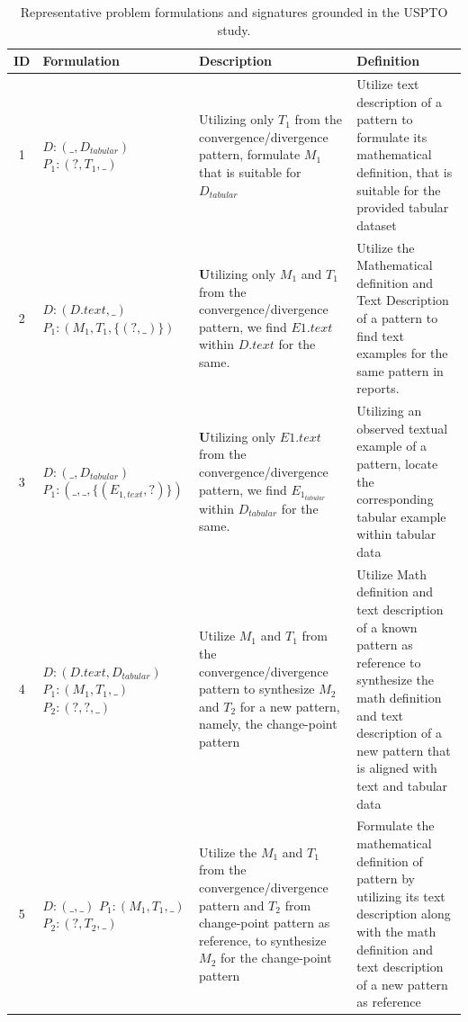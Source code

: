 \documentclass[sigconf,nonacm,anonymous]{acmart}
\begin{document}
\begin{table}[t]
\centering
\small
\setlength{\tabcolsep}{4pt}
\renewcommand{\arraystretch}{1.7} %
\caption{Representative problem formulations and signatures grounded in the USPTO study.}
\label{tab:problem-catalog}
\begin{tabular}{c|p{}|p{}|p{}}
\hline
\textbf{ID} & \textbf{Formulation} & \textbf{Description} & \textbf{Definition} \\
\hline

1 & 
$D: (\_, D_{tabular})$ \newline
$P_1 : (?, T_1, \_)$
& Utilizing only $T_1$ from the convergence/divergence pattern, formulate $M_1$ that is suitable for $D_{tabular}$
& Utilize text description of a pattern to formulate its mathematical definition, that is suitable for the provided tabular dataset \\

2 & 
$D: (D.text, \_)$ \newline
$P_1 : (M_1, T_1, \{(?, \_)\})$
& \textbf Utilizing only $M_1$ and $T_1$ from the convergence/divergence pattern, we find $E1.text$ within $D.text$ for the same.
& Utilize the Mathematical definition and Text Description of a pattern to find text examples for the same pattern in reports. \\

3 & 
$D: (\_, D_{tabular})$ \newline
$P_1 : (\_, \_, \{(E_{1,text}, ?)\})$
& \textbf Utilizing only $E1.text$ from the convergence/divergence pattern, we find $E_{1_{tabular}}$ within $D_{tabular}$ for the same.
&  Utilizing an observed textual example of a pattern, locate the corresponding tabular example within tabular data\\

4 &
$D: (D.text, D_{tabular})$ \newline
$P_1 : (M_1, T_1, \_)$ \newline
$P_2 : (?, ?, \_)$
& Utilize $M_1$ and $T_1$ from the convergence/divergence pattern to synthesize $M_2$ and $T_2$ for a new pattern, namely, the change-point pattern
& Utilize Math definition and text description of a known pattern as reference to synthesize the math definition and text description of a new pattern that is aligned with text and tabular data \\

5 & 
$D: (\_, \_)$ \newline
$P_1 : (M_1, T_1, \_)$ \newline
$P_2 : (?, T_2, \_)$
& Utilize the $M_1$ and $T_1$ from the convergence/divergence pattern and $T_2$ from change-point pattern as reference, to synthesize $M_2$ for the change-point pattern
& Formulate the mathematical definition of pattern by utilizing its text description along with the math definition and text description of a new pattern as reference \\


\end{tabular}
\end{table}
\end{document}

